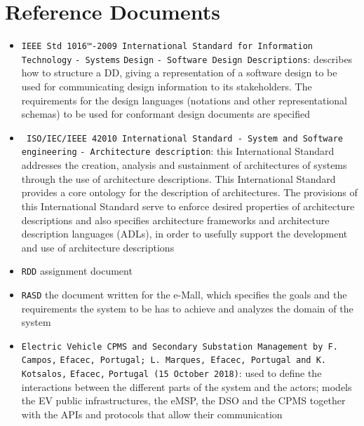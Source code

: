 \section{Reference Documents}
\label{sec:Reference Documents}%
\begin{itemize}
    \item \verb|IEEE Std 1016™-2009 International Standard for Information Technology| \verb|- Systems| \verb|Design| \verb|- Software Design Descriptions|: describes how to structure a DD, giving a representation of a software design to be used for communicating design information to its stakeholders. The requirements for the design languages (notations and other representational schemas) to be used for conformant design documents are specified
    \item \verb| ISO/IEC/IEEE 42010 International Standard - System and Software |\\\verb|engineering| \verb|- Architecture description|: this International Standard addresses the creation, analysis and sustainment of architectures of systems through the use of architecture descriptions. This International Standard provides a core ontology for the description of architectures. The provisions of this International Standard serve to enforce desired properties of architecture descriptions and also specifies architecture frameworks and architecture description languages (ADLs), in order to usefully support the development and use of architecture descriptions
    \item \verb|RDD| assignment document
    \item \verb|RASD| the document written for the e-Mall, which specifies the goals and the requirements the system to be has to achieve and analyzes the domain of the system 
    \item \verb|Electric Vehicle CPMS and Secondary Substation Management by F. Campos,| \verb|Efacec, Portugal; L. Marques, Efacec, Portugal and K. Kotsalos,| \verb|Efacec,| \verb|Portugal (15 October 2018)|: used to define the interactions between the different parts of the system and the actors; models the EV public infrastructures, the eMSP, the DSO and the CPMS together with the APIs and protocols that allow their communication
\end{itemize}

